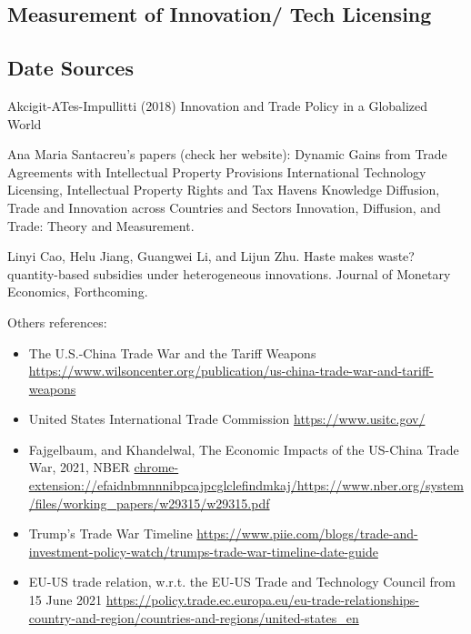 	\subsection{Measurement of Innovation/ Tech Licensing}
	
	\subsection{Date Sources}
	
	Akcigit-ATes-Impullitti (2018) Innovation and Trade Policy in a Globalized World \cite{AkcigitAtesImpullitti2018}
 
Ana Maria Santacreu’s papers (check her website):  
Dynamic Gains from Trade Agreements with Intellectual Property Provisions \cite{Santacreu2022}
International Technology Licensing, Intellectual Property Rights and Tax Havens \cite{Santacreu2023}
Knowledge Diffusion, Trade and Innovation across Countries and Sectors  \cite{CaiLiSantacreu2022}
 Innovation, Diffusion, and Trade: Theory and Measurement.  \cite{Santacreu2015}

Linyi Cao, Helu Jiang, Guangwei Li, and Lijun Zhu. Haste makes waste? quantity-based subsidies under heterogeneous innovations. Journal of Monetary Economics, Forthcoming.\cite{CaoJiangLiZhu2023}





\newpage

\footnotesize



Others references:
\begin{itemize}
	\item The U.S.-China Trade War and the Tariff Weapons \url{https://www.wilsoncenter.org/publication/us-china-trade-war-and-tariff-weapons}
	\item United States International Trade Commission \url{https://www.usitc.gov/}
	\item Fajgelbaum, and Khandelwal, The Economic Impacts of the US-China Trade War, 2021, NBER \url{chrome-extension://efaidnbmnnnibpcajpcglclefindmkaj/https://www.nber.org/system/files/working_papers/w29315/w29315.pdf}
	\item Trump's Trade War Timeline \url{https://www.piie.com/blogs/trade-and-investment-policy-watch/trumps-trade-war-timeline-date-guide}
	\item EU-US trade relation, w.r.t. the EU-US Trade and Technology Council from 15 June 2021 \url{https://policy.trade.ec.europa.eu/eu-trade-relationships-country-and-region/countries-and-regions/united-states_en}
\end{itemize}

